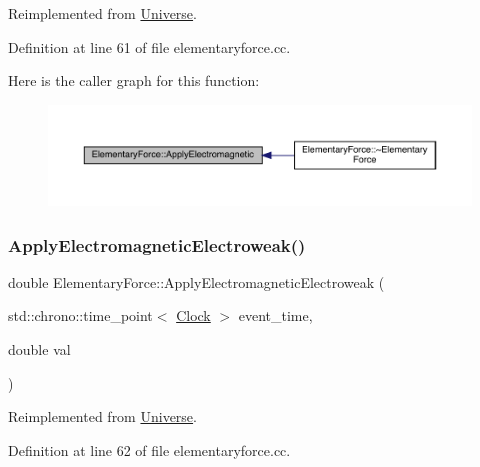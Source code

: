 Reimplemented from \hyperlink{class_universe_a1f787da78fa196ba635db21a9e91dabb}{Universe}.



Definition at line 61 of file elementaryforce.\+cc.

Here is the caller graph for this function\+:
\nopagebreak
\begin{figure}[H]
\begin{center}
\leavevmode
\includegraphics[width=350pt]{class_elementary_force_a0045a3380e468c6cfdbefce829888c1f_icgraph}
\end{center}
\end{figure}
\mbox{\label{class_elementary_force_a3764a27b11760b6ead2c8a23ff25d77a}} 
\subsubsection{\texorpdfstring{Apply\+Electromagnetic\+Electroweak()}{ApplyElectromagneticElectroweak()}}
{\footnotesize\ttfamily double Elementary\+Force\+::\+Apply\+Electromagnetic\+Electroweak (\begin{DoxyParamCaption}\item[{std\+::chrono\+::time\+\_\+point$<$ \hyperlink{universe_8h_a0ef8d951d1ca5ab3cfaf7ab4c7a6fd80}{Clock} $>$}]{event\+\_\+time,  }\item[{double}]{val }\end{DoxyParamCaption})\hspace{0.3cm}{\ttfamily [virtual]}}



Reimplemented from \hyperlink{class_universe_a4c36c1ab30db993307f88363dde5e8c5}{Universe}.



Definition at line 62 of file elementaryforce.\+cc.

